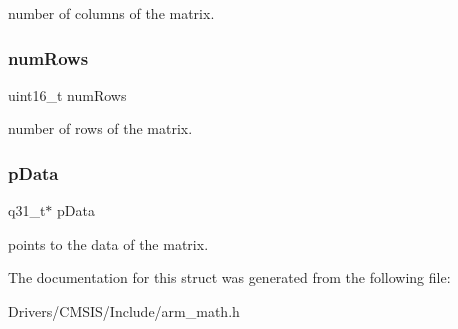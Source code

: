 number of columns of the matrix. \mbox{\label{structarm__matrix__instance__q31_a1bcf80ccdc2acc29198f1592ae300390}} 
\subsubsection{\texorpdfstring{num\+Rows}{numRows}}
{\footnotesize\ttfamily uint16\+\_\+t num\+Rows}

number of rows of the matrix. \mbox{\label{structarm__matrix__instance__q31_ad296f76577326ff280726323536eed6d}} 
\subsubsection{\texorpdfstring{p\+Data}{pData}}
{\footnotesize\ttfamily q31\+\_\+t$\ast$ p\+Data}

points to the data of the matrix. 

The documentation for this struct was generated from the following file\+:\begin{DoxyCompactItemize}
\item 
Drivers/\+C\+M\+S\+I\+S/\+Include/arm\+\_\+math.\+h\end{DoxyCompactItemize}
